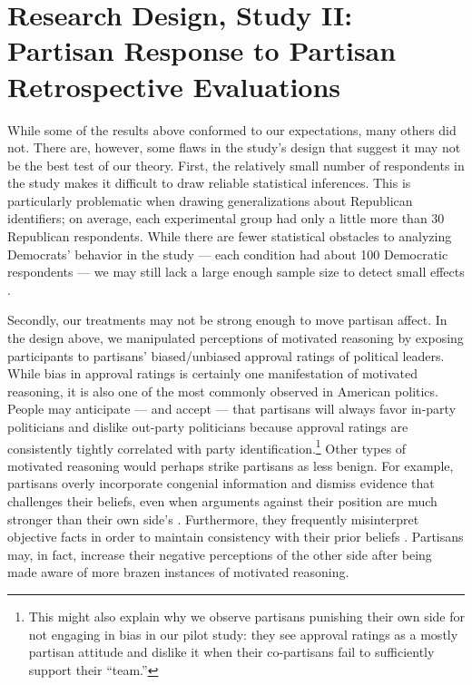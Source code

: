 \documentclass[12pt, letterpaper]{article}
\begin{document}
\section*{Research Design, Study II: Partisan Response to Partisan Retrospective Evaluations}

While some of the results above conformed to our expectations, many others did not. There are, however, some flaws in the study's design that suggest it may not be the best test of our theory. First, the relatively small number of respondents in the study makes it difficult to draw reliable statistical inferences. This is particularly problematic when drawing generalizations about Republican identifiers; on average, each experimental group had only a little more than 30 Republican respondents. While there are fewer statistical obstacles to analyzing Democrats' behavior in the study --- each condition had about 100 Democratic respondents --- we may still lack a large enough sample size to detect small effects \citep[e.g.,][]{cohen_1992}. 

Secondly, our treatments may not be strong enough to move partisan affect. In the design above, we manipulated perceptions of motivated reasoning by exposing participants to partisans' biased/unbiased approval ratings of political leaders. While bias in approval ratings is certainly one manifestation of motivated reasoning, it is also one of the most commonly observed in American politics. People may anticipate --- and accept --- that partisans will always favor in-party politicians and dislike out-party politicians because approval ratings are consistently tightly correlated with party identification.\footnote{This might also explain why we observe partisans punishing their own side for not engaging in bias in our pilot study: they see approval ratings as a mostly partisan attitude and dislike it when their co-partisans fail to sufficiently support their ``team.''} Other types of motivated reasoning would perhaps strike partisans as less benign. For example, partisans overly incorporate congenial information and dismiss evidence that challenges their beliefs, even when arguments against their position are much stronger than their own side's \citep{druckmanetal_2013,taber2006}. Furthermore, they frequently misinterpret objective facts in order to maintain consistency with their prior beliefs \citep{bartels_2002,gainesetal_2007}. Partisans may, in fact, increase their negative perceptions of the other side after being made aware of more brazen instances of motivated reasoning. 
\end{document}
